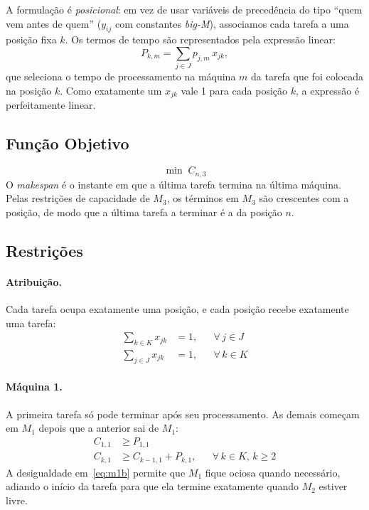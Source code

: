 \documentclass[11pt,a4paper]{article}
\begin{document}
A formulação é \textit{posicional}: em vez de usar variáveis de precedência do tipo ``quem vem antes de quem'' ($y_{ij}$ com constantes \textit{big-M}), associamos cada tarefa a uma posição fixa $k$. Os termos de tempo são representados pela expressão linear:
\begin{equation}
    P_{k,m} = \sum_{j \in J} p_{j,m}\, x_{jk},
\end{equation}
que seleciona o tempo de processamento na máquina $m$ da tarefa que foi colocada na posição $k$. Como exatamente um $x_{jk}$ vale 1 para cada posição $k$, a expressão é perfeitamente linear.

\subsection{Função Objetivo}
\begin{equation}
    \min \; C_{n,3} \label{eq:obj}
\end{equation}
O \textit{makespan} é o instante em que a última tarefa termina na última máquina. Pelas restrições de capacidade de $M_3$, os términos em $M_3$ são crescentes com a posição, de modo que a última tarefa a terminar é a da posição $n$.

\subsection{Restrições}

\paragraph{Atribuição.} Cada tarefa ocupa exatamente uma posição, e cada posição recebe exatamente uma tarefa:
\begin{align}
    \sum_{k \in K} x_{jk} &= 1, && \forall\, j \in J \label{eq:atr1}\\
    \sum_{j \in J} x_{jk} &= 1, && \forall\, k \in K \label{eq:atr2}
\end{align}

\paragraph{Máquina 1.} A primeira tarefa só pode terminar após seu processamento. As demais começam em $M_1$ depois que a anterior sai de $M_1$:
\begin{align}
    C_{1,1} &\ge P_{1,1} \label{eq:m1a}\\
    C_{k,1} &\ge C_{k-1,1} + P_{k,1}, && \forall\, k \in K,\, k \ge 2 \label{eq:m1b}
\end{align}
A desigualdade em~\eqref{eq:m1b} permite que $M_1$ fique ociosa quando necessário, adiando o início da tarefa para que ela termine exatamente quando $M_2$ estiver livre.
\end{document}
